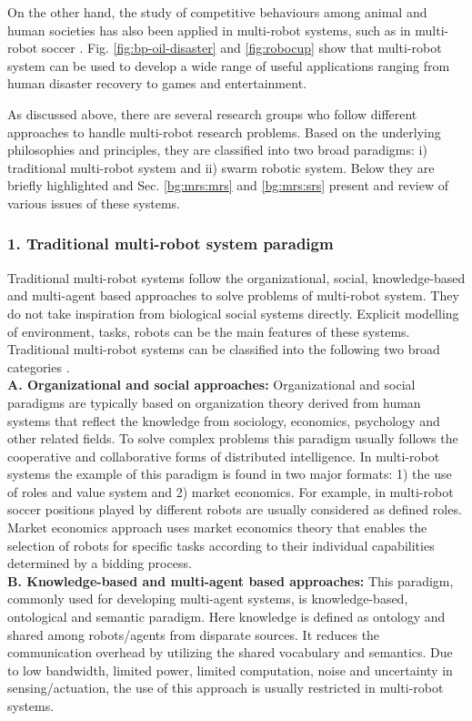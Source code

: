 On the other hand, the study of competitive behaviours among animal and human societies has also been applied in multi-robot systems, such as in multi-robot soccer \cite{Asada+1999}. Fig. \ref{fig:bp-oil-disaster} and \ref{fig:robocup} show that multi-robot system can be used to develop a wide range of useful applications ranging from human disaster recovery to games and entertainment.

As discussed above, there are several research groups who follow different approaches to handle multi-robot research problems. Based on the underlying philosophies and principles, they are classified into two broad paradigms: i) traditional multi-robot system and ii) swarm robotic system. Below they are briefly highlighted  and Sec. \ref{bg:mrs:mrs} and \ref{bg:mrs:srs} present and review of various issues of these systems. 
%
\subsubsection*{1. Traditional multi-robot system paradigm}
Traditional multi-robot systems follow the organizational, social, knowledge-based and multi-agent based approaches to solve problems of multi-robot system. They do not take inspiration from biological social systems directly. Explicit modelling of environment, tasks, robots can be the main features of these systems. Traditional multi-robot systems can be classified into the following two broad categories \cite{Parker2008}.\\
\textbf{A. Organizational and social approaches: }
Organizational and social paradigms are typically based on organization theory derived from human systems that reflect the knowledge from sociology, economics, psychology and other related fields. To solve complex problems this paradigm usually follows the cooperative and collaborative forms of distributed intelligence. In multi-robot systems the example of this paradigm is found in two major formats: 1) the use of roles and value system and 2) market economics.  For example, in multi-robot soccer \cite{Stone+1999} positions played by different robots are usually considered as defined roles. Market economics approach \cite{Dias+2006} uses market economics theory that enables the selection of robots for specific tasks according to their individual capabilities determined by a bidding process.\\
\textbf{B. Knowledge-based and multi-agent based approaches: }
This paradigm, commonly used for developing multi-agent systems, is knowledge-based, ontological and semantic paradigm. Here knowledge is defined as ontology and shared among robots/agents from disparate sources. It reduces the communication overhead by utilizing the shared vocabulary and semantics. Due to low bandwidth, limited power, limited computation, noise and uncertainty in sensing/actuation, the use of this approach is usually restricted in multi-robot systems.
% 
